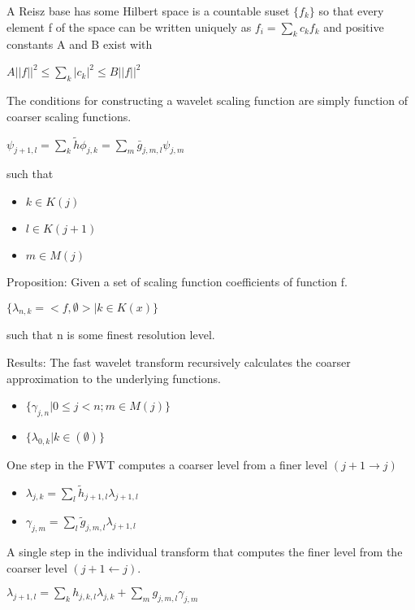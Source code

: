 \documentclass[11pt]{article}
\begin{document}
A Reisz base has some Hilbert space is a countable suset $\{f_k\}$ so that every element f of the space can be written uniquely as $f_i =\sum_k c_k f_k$ and positive constants A and B exist with 

$A||f||^2 \le \sum_k |c_k|^2 \le B||f||^2 $

The conditions for constructing a wavelet scaling function are simply function of coarser scaling functions.

$\psi_{j+1,l} = \sum\limits_k \tilde{h} \phi_{j,k} = \sum\limits_m \bar{g}_{j,m,l} \psi_{j,m}$

such that 
\begin{itemize}
\item $k\in K(j)$
\item $l\in K(j+1)$
\item $m\in M(j)$
\end{itemize}

Proposition:  
Given a set of scaling function coefficients of function f.

$\{ \lambda_{n,k} = <f,\emptyset> | k\in K(x) \}   $

such that n is some finest resolution level.  

Results:
The fast wavelet transform recursively calculates the coarser approximation to the underlying functions.  
\begin{itemize}
\item $ \{\gamma_{j,n} | 0 \le j < n; m \in M(j) \} $
\item $\{ \lambda_{0,k} | k\in (\emptyset) \}$
\end{itemize}

One step in the FWT computes a coarser level from a finer level $( j+1 \to j)$
\begin{itemize}
\item $\lambda_{j,k} = \sum\limits _l \tilde{h}_{j+1,l} \lambda_{j+1,l}$
\item $\gamma_{j,m} = \sum\limits_l \tilde{g}_{j,m,l} \lambda_{j+1,l} $
\end{itemize}

A single step in the individual transform that computes the finer level from the coarser level  $(j+1 \leftarrow j)$. 


$\lambda_{j+1,l} = \sum\limits_k h_{j,k,l} \lambda_{j,k} + \sum\limits_m g_{j,m,l} \gamma_{j,m} $

 
\end{document}
